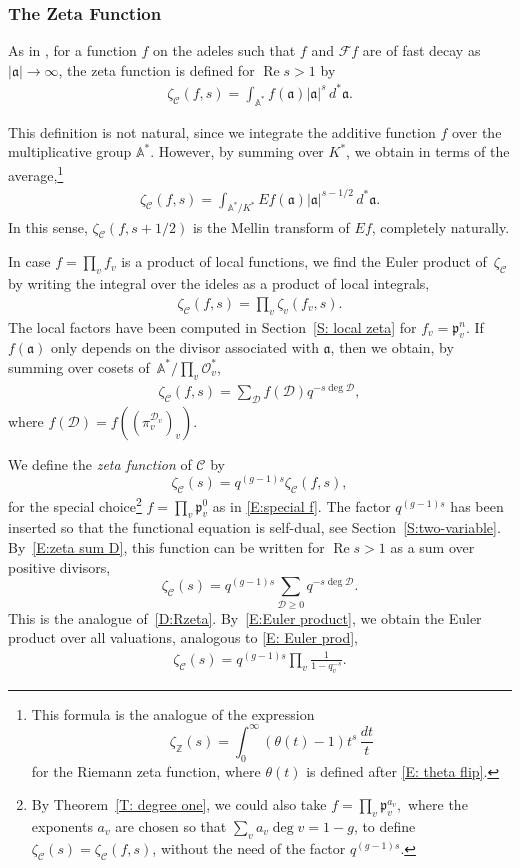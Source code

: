\documentclass{amsart}
\renewcommand\Re{\operatorname*{Re}}	\renewcommand\Im{\operatorname*{Im}}
\newcommand\Z{\mathbb{Z}}	\newcommand\C{\mathbb{C}}
\newcommand\oo{\mathcal{O}}
\newcommand\Curve{\mathcal{C}}
\newcommand\pr{\mathfrak{p}}
\newcommand\Fo{\mathcal{F}}
\newcommand\A{\mathbb{A}}
\newcommand\calD{\mathcal{D}}	\newcommand\calK{\mathcal{K}}
\newcommand\gota{\mathfrak{a}}	\newcommand\gotb{\mathfrak{b}}
\theoremstyle{definition}\newtheorem{definition}[theorem]{Definition}
\theoremstyle{remark}\newtheorem{remark}[theorem]{Remark}
\numberwithin{equation}{section}
\begin{document}
\subsubsection{The Zeta Function}

As in \cite{Tate},
for a function $f$ on the adeles such that $f$ and $\Fo f$ are of fast decay as $|\gota|\to\infty$,
the zeta function is defined for $\Re s>1$ by
\begin{gather}\label{E: zeta_C=int}
\zeta_\Curve(f,s)=\int_{\A^*}f(\gota)|\gota|^s\,d^*\gota.
\end{gather}

This definition is not natural,
since we integrate the additive function $f$ over the multiplicative group $\A^*$.
However,
by summing over $K^*$,
we obtain in terms of the average,\footnote
{This formula is the analogue of the expression
$$
\zeta_\Z(s)=\int_0^\infty(\theta(t)-1)t^s\,\frac{dt}t
$$
for the Riemann zeta function,
where $\theta(t)$ is defined after \eqref{E: theta flip}.}
\begin{gather}\label{E: zeta_C=E}
\zeta_\Curve(f,s)=\int_{\A^*/K^*}Ef(\gota)|\gota|^{s-1/2}\,d^*\gota.
\end{gather}
In this sense,
$\zeta_\Curve(f,s+1/2)$ is the Mellin transform of $Ef$,
completely naturally.

In case $f=\prod_vf_v$ is a product of local functions,
we find the Euler product of~$\zeta_\Curve$ by writing the integral over the ideles as a product of local integrals,
\begin{gather}\label{E:Euler product}
\zeta_\Curve(f,s)=\prod_v\zeta_v(f_v,s).
\end{gather}
The local factors have been computed in Section~\ref{S: local zeta} for $f_v=\pr_v^n$.
If $f(\gota)$ only depends on the divisor associated with $\gota$,
then we obtain,
 by summing over cosets of~$\A^*/\prod_v\oo_v^*$,
\begin{gather}\label{E:zeta sum D}
\zeta_\Curve(f,s)=\sum_{\calD}f(\calD)q^{-s\deg\calD},
\end{gather}
where $f(\calD)=f((\pi_v^{\calD_v})_v)$.\medskip

We define the {\em zeta function\/} of $\Curve$ by
$$
\zeta_\Curve(s)=q^{(g-1)s}\zeta_\Curve(f,s),
$$
for the special choice\footnote
{By Theorem~\ref{T: degree one},
we could also take
$
f=\prod_{v}\pr_v^{a_v},
$
where the exponents $a_v$ are chosen so that $\sum_va_v\deg v=1-g$,
to define $\zeta_\Curve(s)=\zeta_\Curve(f,s)$,
without the need of the factor $q^{(g-1)s}$.} $f=\prod_v\pr_v^0$ as in \eqref{E:special f}.
The factor $q^{(g-1)s}$ has been inserted so that the functional equation is self-dual,
see Section~\ref{S:two-variable}.
By~\eqref{E:zeta sum D},
this function can be written for $\Re s>1$ as a sum over positive divisors,
$$
\zeta_\Curve(s)=q^{(g-1)s}\sum_{\calD\geq0}q^{-s\deg\calD}.
$$
This is the analogue of~\eqref{D:Rzeta}.
By~\eqref{E:Euler product},
we obtain the Euler product over all valuations,
 analogous to \eqref{E: Euler prod},
\begin{gather}\label{E: Euler zetaC}
\zeta_\Curve(s)=q^{(g-1)s}\prod_v\frac1{1-q_v^{-s}}.
\end{gather}
\end{document}
